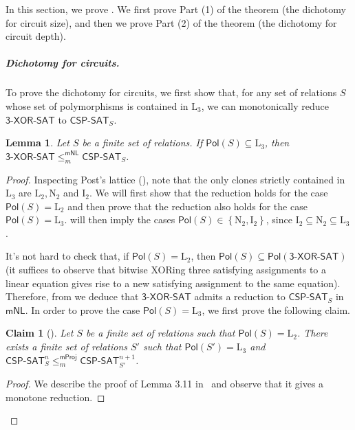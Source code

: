 \documentclass[10pt,a4paper]{article}
\newtheorem{lemma}[theorem]{Lemma}
\newtheorem*{claim*}{Claim}
\newcommand{\complexityfont}[1]{\mathsf{#1}}
\newcommand{\monclass}[1]{\mathsf{m}#1}
\newcommand\NL           {\complexityfont{NL}}
\def\mNL          {\monclass{\NL}}
\newcommand{\txorsat}{\mathsf{3\mbox{-}XOR\mbox{-}SAT}}
\def\sseq{\subseteq}
\newcommand{\set}[1]{\left\{#1\right\}}
\newcommand{\CSPf}[1]{\mathsf{CSP}\text{-}\mathsf{SAT}_{#1}}
\newcommand{\CSPfn}[2]{\CSPf{#1}^{#2}}
\newcommand{\Pol}{\mathsf{Pol}}
\newcommand{\mnlmred}{\leq^{\mNL}_m}
\newcommand{\mprojred}{\leq^{\mathsf{mProj}}_m}
\newcommand{\clonefont}[1]{\mathrm{#1}}
\begin{document}
In this section, we prove .
We first prove Part (1) of the theorem (the dichotomy for circuit size),
and then we prove Part (2) of the theorem (the dichotomy for circuit
depth).

\subparagraph{Dichotomy for circuits.}

To prove the dichotomy for circuits, 
we first show that, for
any set of relations $S$ whose set of polymorphisms is contained in $\clonefont{L_3}$,
we can monotonically reduce $\txorsat$ to $\CSPf{S}$.


\begin{lemma}
    \label{lem:l3_xorsat}
    Let $S$ be a finite set of relations.
    If 
    $\Pol(S) \sseq \clonefont{L_3}$,
    then
    $\txorsat \mnlmred \CSPf{S}$.
\end{lemma}
\begin{proof}
    Inspecting Post's lattice
    (),
    note that the only clones 
    strictly contained in
    $\clonefont{L_3}$ are
    $\clonefont{L_2}, \clonefont{N_2}$ and $\clonefont{I_2}$.
    We will first show that the reduction holds for the case
    $\Pol(S)=\clonefont{L_2}$ and then prove that 
    the reduction also holds for the case $\Pol(S)=\clonefont{L_3}$.
    will then imply the cases $\Pol(S) \in \set{\clonefont{N_2},\clonefont{I_2}}$, since
    $\clonefont{I_2} \sseq \clonefont{N_2} \sseq \clonefont{L_3}$.


    It's not hard to check that,
    if $\Pol(S) = \clonefont{L_2}$,
    then $\Pol(S) \sseq \Pol(\txorsat)$
    (it suffices to observe that bitwise XORing
    three satisfying assignments to a linear equation gives rise to 
    a new satisfying assignment to the same equation).
    Therefore, from  we deduce
    that $\txorsat$ admits a reduction to
    $\CSPf{S}$ in $\mNL$.
    In order to prove the case $\Pol(S) = \clonefont{L_3}$, we first prove the
    following claim.

    \begin{claim*}[]
        \label{lem:l2-to-l3}
        Let $S$ be a finite set of relations such that
        $\Pol(S) = \clonefont{L_2}$.
        There exists a finite set of relations $S'$
        such that
        $\Pol(S') = \clonefont{L_3}$
        and
        $\CSPfn{S}{n} \mprojred \CSPfn{S'}{n+1}$.
    \end{claim*}
    \begin{proof}
        We describe the proof of Lemma 3.11
        in~\cite{DBLP:journals/jcss/AllenderBISV09}
        and observe that it gives a monotone reduction.


\end{proof}
\end{proof}
\end{document}
